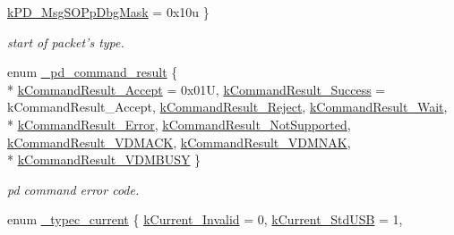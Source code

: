 \begin{DoxyCompactItemize}
\hyperlink{group__usb__pd__stack_gga7a924235403e0acab44d01e720091aa1acf84efe13ab974183f17fa04e9084d5c}{k\-P\-D\-\_\-\-Msg\-S\-O\-Pp\-Dbg\-Mask} = 0x10u
 \}
\begin{DoxyCompactList}\small\item\em start of packet's type. \end{DoxyCompactList}\item 
enum \hyperlink{group__usb__pd__stack_gaa0c9fbfbfb4442ef9d805438bfeb045c}{\-\_\-pd\-\_\-command\-\_\-result} \{ \\*
\hyperlink{group__usb__pd__stack_ggaa0c9fbfbfb4442ef9d805438bfeb045ca5cbc28129fbc8ef711e9af7a9400d858}{k\-Command\-Result\-\_\-\-Accept} = 0x01\-U, 
\hyperlink{group__usb__pd__stack_ggaa0c9fbfbfb4442ef9d805438bfeb045ca41691f050dc39a33f802354eacc3df48}{k\-Command\-Result\-\_\-\-Success} = k\-Command\-Result\-\_\-\-Accept, 
\hyperlink{group__usb__pd__stack_ggaa0c9fbfbfb4442ef9d805438bfeb045ca1f47bf73466bcfd41a0e492b4ee77221}{k\-Command\-Result\-\_\-\-Reject}, 
\hyperlink{group__usb__pd__stack_ggaa0c9fbfbfb4442ef9d805438bfeb045cabbcc951c401dbb830050a5ece204079a}{k\-Command\-Result\-\_\-\-Wait}, 
\\*
\hyperlink{group__usb__pd__stack_ggaa0c9fbfbfb4442ef9d805438bfeb045ca2037b8a85f98d8d2413d589dbe7ea4fd}{k\-Command\-Result\-\_\-\-Error}, 
\hyperlink{group__usb__pd__stack_ggaa0c9fbfbfb4442ef9d805438bfeb045caa7d52b6983bc63b06da53587776a1664}{k\-Command\-Result\-\_\-\-Not\-Supported}, 
\hyperlink{group__usb__pd__stack_ggaa0c9fbfbfb4442ef9d805438bfeb045ca8de7fa85a3e37afed0b95cd975959f13}{k\-Command\-Result\-\_\-\-V\-D\-M\-A\-C\-K}, 
\hyperlink{group__usb__pd__stack_ggaa0c9fbfbfb4442ef9d805438bfeb045cac783d71949646db3d0780d123de6bf3c}{k\-Command\-Result\-\_\-\-V\-D\-M\-N\-A\-K}, 
\\*
\hyperlink{group__usb__pd__stack_ggaa0c9fbfbfb4442ef9d805438bfeb045ca7d97a0d078d217c54b88f5a076204572}{k\-Command\-Result\-\_\-\-V\-D\-M\-B\-U\-S\-Y}
 \}
\begin{DoxyCompactList}\small\item\em pd command error code. \end{DoxyCompactList}\item 
enum \hyperlink{group__usb__pd__stack_gaf956bb4d3d27df52fb694311b8219b0e}{\-\_\-typec\-\_\-current} \{ \hyperlink{group__usb__pd__stack_ggaf956bb4d3d27df52fb694311b8219b0ea6a78d430fc49679cceb7e12ca7a8c960}{k\-Current\-\_\-\-Invalid} = 0, 
\hyperlink{group__usb__pd__stack_ggaf956bb4d3d27df52fb694311b8219b0ea763adf3048e338ea883604ec91ea732b}{k\-Current\-\_\-\-Std\-U\-S\-B} = 1, 

\end{DoxyCompactItemize}
